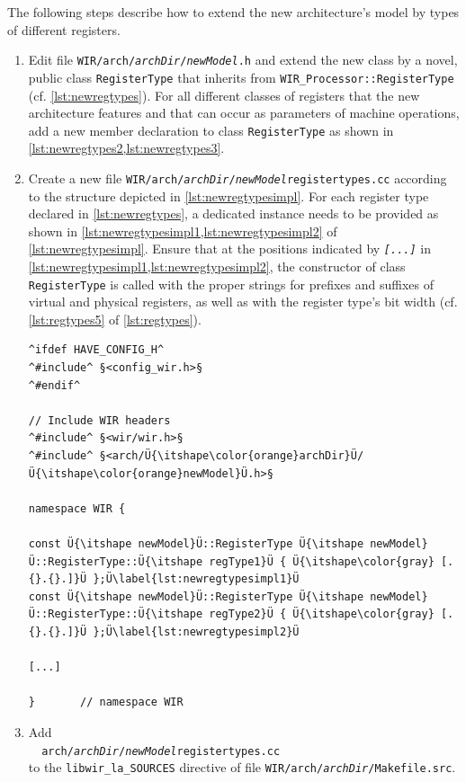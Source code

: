 The following steps describe how to extend the new architecture's model by types of different registers.
\begin{enumerate}[resume]
  \item Edit file \texttt{WIR/arch/{\itshape archDir}/{\itshape newModel}.h} and extend the new class by a novel, public class \texttt{RegisterType} that inherits from \texttt{WIR\_Processor::RegisterType} (cf. \cref{lst:newregtypes}).
  For all different classes of registers that the new architecture features and that can occur as parameters of machine operations, add a new member declaration to class \texttt{RegisterType} as shown in \cref{lst:newregtypes2,lst:newregtypes3}.

  \item Create a new file \texttt{WIR/arch/{\itshape archDir}/{\itshape newModel}registertypes.cc} according to the structure depicted in \cref{lst:newregtypesimpl}.\label{enum:newregtype}
  For each register type declared in \cref{lst:newregtypes}, a dedicated instance needs to be provided as shown in \cref{lst:newregtypesimpl1,lst:newregtypesimpl2} of \cref{lst:newregtypesimpl}.
  Ensure that at the positions indicated by \texttt{\itshape [.{}.{}.]} in \cref{lst:newregtypesimpl1,lst:newregtypesimpl2}, the constructor of class \texttt{RegisterType} is called with the proper strings for prefixes and suffixes of virtual and physical registers, as well as with the register type's bit width (cf. \cref{lst:regtypes5} of \cref{lst:regtypes}).

\begin{lstlisting}[style=code,float=!t,caption={Implementation of a New Processor Model's Register Types},label=lst:newregtypesimpl]
^ifdef HAVE_CONFIG_H^
^#include^ §<config_wir.h>§
^#endif^

// Include WIR headers
^#include^ §<wir/wir.h>§
^#include^ §<arch/Ü{\itshape\color{orange}archDir}Ü/Ü{\itshape\color{orange}newModel}Ü.h>§

namespace WIR {

const Ü{\itshape newModel}Ü::RegisterType Ü{\itshape newModel}Ü::RegisterType::Ü{\itshape regType1}Ü { Ü{\itshape\color{gray} [.{}.{}.]}Ü };Ü\label{lst:newregtypesimpl1}Ü
const Ü{\itshape newModel}Ü::RegisterType Ü{\itshape newModel}Ü::RegisterType::Ü{\itshape regType2}Ü { Ü{\itshape\color{gray} [.{}.{}.]}Ü };Ü\label{lst:newregtypesimpl2}Ü

[...]

}       // namespace WIR
\end{lstlisting}

  \item Add \\
  \verb|  arch/|\texttt{\itshape archDir}\verb|/|\texttt{\itshape newModel}\verb|registertypes.cc| \\
  to the \texttt{libwir\_la\_SOURCES} directive of file \texttt{WIR/arch/{\itshape archDir}/Makefile.src}.
\end{enumerate}


